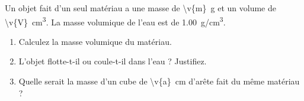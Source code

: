 Un objet fait d'un seul matériau a une masse de \qty{\v{m}}{g} et un volume de \qty{\v{V}}{cm^3}. La masse volumique de l'eau est de \qty{1.00}{g/cm^3}.

\begin{enumerate}[label=\alph*)]
    \item Calculez la masse volumique du matériau.
    \item L'objet flotte-t-il ou coule-t-il dans l'eau ? Justifiez.
    \item Quelle serait la masse d'un cube de \qty{\v{a}}{cm} d'arête fait du même matériau ?
\end{enumerate}
